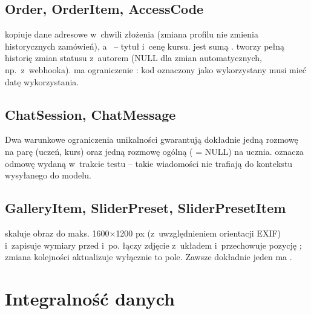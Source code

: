 \subsection{Order, OrderItem, AccessCode}
 kopiuje dane adresowe w~chwili złożenia (zmiana profilu nie zmienia
historycznych zamówień), a~ -- tytuł i~cenę kursu.  jest sumą
.  tworzy pełną historię zmian statusu
z~autorem (NULL dla zmian automatycznych, np.\ z~webhooka).  ma
ograniczenie : kod oznaczony jako wykorzystany musi mieć datę wykorzystania.

\subsection{ChatSession, ChatMessage}
Dwa warunkowe ograniczenia unikalności gwarantują dokładnie jedną rozmowę na parę
(uczeń, kurs) oraz jedną rozmowę ogólną ( = NULL) na ucznia.
 oznacza odmowę wydaną w~trakcie testu -- takie wiadomości nie
trafiają do kontekstu wysyłanego do modelu.

\subsection{GalleryItem, SliderPreset, SliderPresetItem}
 skaluje obraz do maks. 1600$\times$1200 px (z~uwzględnieniem
orientacji EXIF) i~zapisuje wymiary przed i~po.  łączy zdjęcie
z~układem i~przechowuje pozycję ; zmiana kolejności aktualizuje wyłącznie to
pole. Zawsze dokładnie jeden  ma .

\section{Integralność danych}

